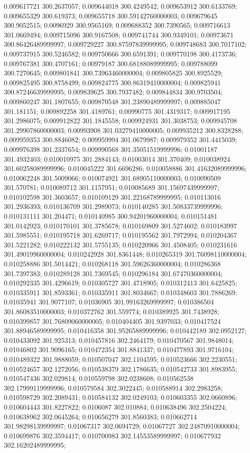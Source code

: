0.009617721 300.2637057; 0.009644018 300.4249542; 0.009653912 300.6133769; 0.009655329 300.619373; 0.009655718 300.59142760000003; 0.009679645 300.9052515; 0.0096929 300.9565169; 0.009688352 300.7390565; 0.009716613 301.0669494; 0.009715096 300.9167508; 0.009741744 300.9349101; 0.00973671 300.86426489999997; 0.009729227 300.87597839999995; 0.009748683 300.7017102; 0.009737915 300.5246582; 0.009750666 300.6591391; 0.009770198 300.4173736; 0.009767381 300.4707161; 0.00979187 300.68188089999995; 0.009788099 300.7270645; 0.009801841 300.73963460000004; 0.009805825 300.8925529; 0.009825495 300.8758499; 0.009824775 300.86319410000004; 0.009825941 300.87246639999995; 0.009839625 300.7937482; 0.009844834 300.9703504; 0.009860247 301.1807655; 0.009870548 301.23890489999997; 0.009885047 301.181151; 0.009892258 301.4189761; 0.00990775 301.4319317; 0.009917195 301.2986075; 0.009912822 301.1845558; 0.009924931 301.3038753; 0.009945708 301.29907860000003; 0.00993908 301.03279410000005; 0.009935212 300.8328288; 0.009959353 300.8846082; 0.009959994 301.0679987; 0.009979352 301.4415039; 0.009976398 301.2337654; 0.009990568 301.35051519999996; 0.01001187 301.4932403; 0.010010975 301.2884143; 0.01003014 301.370409; 0.010038924 301.60258089999996; 0.010045222 301.6696286; 0.010058886 301.41632089999996; 0.010062248 301.5009066; 0.010074921 301.68905110000003; 0.010090509 301.570781; 0.010089712 301.1157951; 0.010085689 301.15697439999997; 0.010102598 301.3603657; 0.010109129 301.22168789999995; 0.010113016 301.2936393; 0.010136709 301.2989073; 0.010140285 301.50833739999996; 0.010131111 301.204471; 0.010140985 300.94201960000004; 0.010151481 301.0142923; 0.010170101 301.3785678; 0.010169809 301.5274602; 0.010183997 301.5985551; 0.010195718 301.6269717; 0.010195562 301.7972994; 0.010204367 301.5221282; 0.010222132 301.5755135; 0.010220966 301.4508405; 0.010231616 301.49019960000004; 0.010242928 301.8361448; 0.010265319 301.76098110000004; 0.010258886 301.5014421; 0.010268118 301.59626360000004; 0.010286368 301.7397383; 0.010289128 301.7369545; 0.010296184 301.67470360000004; 0.010292335 301.4296619; 0.010305727 301.4718905; 0.010312413 301.6425825; 0.010335911 301.8593361; 0.010335911 301.8034667; 0.010348603 301.7886269; 0.01035941 301.9077107; 0.01036905 301.99163269999997; 0.010386504 301.86083510000003; 0.010372762 301.559774; 0.010389925 301.7438928; 0.010399857 301.76809060000005; 0.010404405 301.9397033; 0.010417524 301.88946589999995; 0.010416358 301.95265889999996; 0.010442189 302.0952127; 0.010433092 301.925313; 0.010457816 302.2464179; 0.010470567 301.9848014; 0.01046802 301.9096165; 0.010472354 301.8841337; 0.010477893 301.9716104; 0.010489322 301.9888059; 0.010507047 302.1104595; 0.010523666 302.2230551; 0.010524657 302.1272056; 0.010538379 302.1786635; 0.010542733 301.8983955; 0.010547436 302.029814; 0.010559798 302.0238608; 0.010562538 302.17999119999996; 0.010579584 302.3022445; 0.010588914 302.2983258; 0.010598729 302.2089431; 0.010584132 302.0249103; 0.010603355 302.0660896; 0.010604443 301.8227822; 0.0106087 302.010884; 0.010638496 302.2504224; 0.010638962 302.0645264; 0.010656279 301.8560383; 0.010662714 301.98298139999997; 0.01067317 302.0694729; 0.01067727 302.24870910000004; 0.010699876 302.3594417; 0.010700983 302.14553589999997; 0.010677932 302.16202489999995; 